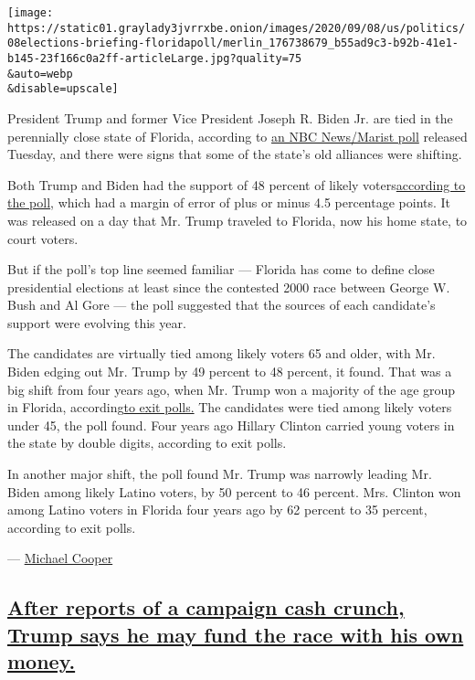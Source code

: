\texttt{[image: https://static01.graylady3jvrrxbe.onion/images/2020/09/08/us/politics/08elections-briefing-floridapoll/merlin\_176738679\_b55ad9c3-b92b-41e1-b145-23f166c0a2ff-articleLarge.jpg?quality=75\\\&auto=webp\\\&disable=upscale]}

President Trump and former Vice President Joseph R. Biden Jr. are tied
in the perennially close state of Florida, according to
\href{https://www.nbcnews.com/politics/meet-the-press/poll-trump-biden-are-tied-battleground-florida-n1239510}{an
NBC News/Marist poll} released Tuesday, and there were signs that some
of the state's old alliances were shifting.

Both Trump and Biden had the support of 48 percent of likely
voters\href{https://www.documentcloud.org/documents/7203771-NBC-News-Marist-Poll-FL-Annotated-Questionnaire.html}{according
to the poll}, which had a margin of error of plus or minus 4.5
percentage points. It was released on a day that Mr. Trump traveled to
Florida, now his home state, to court voters.

But if the poll's top line seemed familiar --- Florida has come to
define close presidential elections at least since the contested 2000
race between George W. Bush and Al Gore --- the poll suggested that the
sources of each candidate's support were evolving this year.

The candidates are virtually tied among likely voters 65 and older, with
Mr. Biden edging out Mr. Trump by 49 percent to 48 percent, it found.
That was a big shift from four years ago, when Mr. Trump won a majority
of the age group in Florida,
according\href{https://www.nbcnews.com/politics/2016-election/fl/}{to
exit polls.} The candidates were tied among likely voters under 45, the
poll found. Four years ago Hillary Clinton carried young voters in the
state by double digits, according to exit polls.

In another major shift, the poll found Mr. Trump was narrowly leading
Mr. Biden among likely Latino voters, by 50 percent to 46 percent. Mrs.
Clinton won among Latino voters in Florida four years ago by 62 percent
to 35 percent, according to exit polls.

--- \href{https://www.nytimes3xbfgragh.onion/by/michael-cooper}{Michael
Cooper}

\hypertarget{after-reports-of-a-campaign-cash-crunch-trump-says-he-may-fund-the-race-with-his-own-money}{%
\subsection{\texorpdfstring{\protect\hyperlink{after-reports-of-a-campaign-cash-crunch-trump-says-he-may-fund-the-race-with-his-own-money}{After
reports of a campaign cash crunch, Trump says he may fund the race with
his own
money.}}{After reports of a campaign cash crunch, Trump says he may fund the race with his own money.}}\label{after-reports-of-a-campaign-cash-crunch-trump-says-he-may-fund-the-race-with-his-own-money}}

